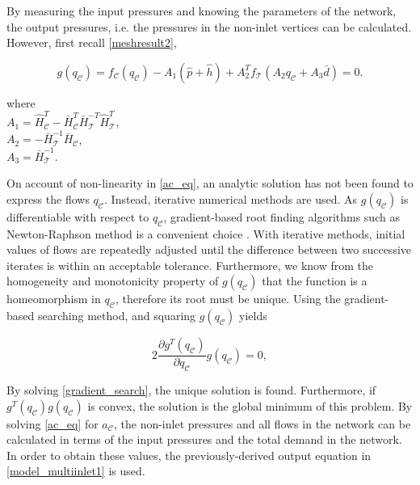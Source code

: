 By measuring the input pressures and knowing the parameters of the network, the output pressures, i.e. the pressures in the non-inlet vertices can be calculated. However, first recall \eqref{meshresult2}, 

\begin{equation}
  \label{ac_eq} 
  g(q_{\mathcal{C}}) = f_{\mathcal{C}}(q_\mathcal{C}) - A_1(\hat{p} + \hat{h}) + A_2^T f_{\mathcal{T}}(A_2 q_\mathcal{C} + A_3 \bar{d}) = 0.
\end{equation}

\begin{minipage}[t]{0.4\textwidth}
where\\
\hspace*{8mm} $A_1 = \hat{H}^T_{\mathcal{C}} -\bar{H}^T_{\mathcal{C}}\bar{H}^{-T}_{\mathcal{T}}\hat{H}^T_{\mathcal{T}}$, \vspace*{1.5mm}  \\
\hspace*{8mm} $A_2 = -\bar{H}^{-1}_{\mathcal{T}} \bar{H}_{\mathcal{C}} $, \vspace*{1.5mm}\\
\hspace*{8mm} $A_3 = \bar{H}^{-1}_{\mathcal{T}}$. 
\end{minipage}

On account of non-linearity in \eqref{ac_eq}, an analytic solution has not been found to express the flows $q_{\mathcal{C}}$. Instead, iterative numerical methods are used. As $g(q_{\mathcal{C}})$ is differentiable with respect to $q_{\mathcal{C}}$, gradient-based root finding algorithms such as Newton-Raphson method is a convenient choice \cite{woodford1997numerical}. With iterative methods, initial values of flows are repeatedly adjusted until the difference between two successive iterates is within an acceptable tolerance. Furthermore, we know from the homogeneity and monotonicity property of $g(q_{\mathcal{C}})$ that the function is a homeomorphism in $q_{\mathcal{C}}$, therefore its root must be unique. Using the gradient-based searching method, and squaring $g(q_{\mathcal{C}})$  yields

\begin{equation}
\label{gradient_search} 
  2 \frac{\partial g^T(q_{\mathcal{C}})}{\partial q_{\mathcal{C}}} g(q_{\mathcal{C}}) = 0, 
\end{equation}

By solving \eqref{gradient_search}, the unique solution is found. Furthermore, if $g^T(q_{\mathcal{C}}) g(q_{\mathcal{C}})$ is convex, the solution is the global minimum of this problem. By solving \eqref{ac_eq} for $a_{\mathcal{C}}$, the non-inlet pressures and all flows in the network can be calculated in terms of the input pressures and the total demand in the network. In order to obtain these values, the previously-derived output equation in \eqref{model_multiinlet1} is used. 

